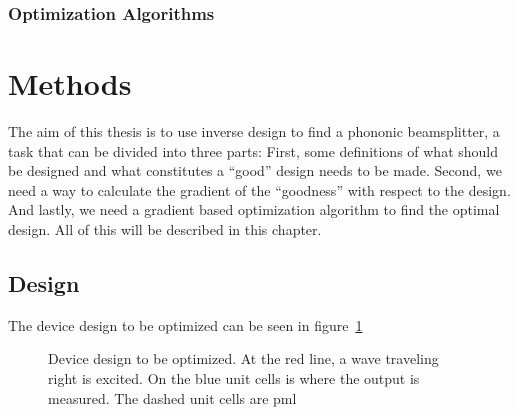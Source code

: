 \documentclass[11pt]{article}
\begin{document}

\subsubsection{Optimization Algorithms}




\section{Methods}

The aim of this thesis is to use inverse design to find a phononic beamsplitter,
a task that can be divided into three parts: 
First, some definitions of what
should be designed and what constitutes a ``good'' design needs to be made.
Second, we need a way to calculate the gradient of the ``goodness'' with respect
to the design.
And lastly, we need a gradient based optimization algorithm to find the optimal
design.
All of this will be described in this chapter.

\subsection{Design}

The device design to be optimized can be seen in figure~\ref{fig:bs-design}

\begin{figure}[htpb]
	\centering
	
	\caption{
		Device design to be optimized.
		At the red line, a wave traveling right is excited.
		On the blue unit cells is where the output is measured.
		The dashed unit cells are \gls{pml}
	}
	\label{fig:bs-design}
\end{figure}

\end{document}
